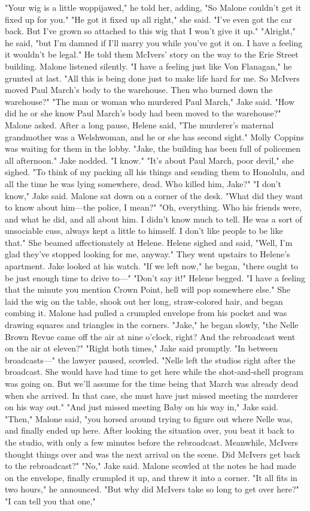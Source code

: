 \documentclass{novel}
\begin{document}
"Your wig is a little woppijawed," he told her, adding, "So Malone couldn't get it fixed up for you." "He got it fixed up all right," she said. "I've even got the car back. But I've grown so attached to this wig that I won't give it up." "Alright," he said, "but I'm damned if I'll marry you while you've got it on. I have a feeling it wouldn't be legal." He told them McIvers' story on the way to the Erie Street building. Malone listened silently. "I have a feeling just like Von Flanagan," he grunted at last. "All this is being done just to make life hard for me. So McIvers moved Paul March's body to the warehouse. Then who burned down the warehouse?" "The man or woman who murdered Paul March," Jake said. "How did he or she know Paul March's body had been moved to the warehouse?" Malone asked. After a long pause, Helene said, "The murderer's maternal grandmother was a Welshwoman, and he or she has second sight." Molly Coppins was waiting for them in the lobby. "Jake, the building has been full of policemen all afternoon." Jake nodded. "I know." "It's about Paul March, poor devil," she sighed. "To think of my packing all his things and sending them to Honolulu, and all the time he was lying somewhere, dead. Who killed him, Jake?" "I don't know," Jake said. Malone sat down on a corner of the desk. "What did they want to know about him—the police, I mean?" "Oh, everything. Who his friends were, and what he did, and all about him. I didn't know much to tell. He was a sort of unsociable cuss, always kept a little to himself. I don't like people to be like that." She beamed affectionately at Helene. Helene sighed and said, "Well, I'm glad they've stopped looking for me, anyway." They went upstairs to Helene's apartment. Jake looked at his watch. "If we left now," he began, "there ought to be just enough time to drive to—" "Don't say it!" Helene begged. "I have a feeling that the minute you mention Crown Point, hell will pop somewhere else." She laid the wig on the table, shook out her long, straw-colored hair, and began combing it. Malone had pulled a crumpled envelope from his pocket and was drawing squares and triangles in the corners. "Jake," he began slowly, "the Nelle Brown Revue came off the air at nine o'clock, right? And the rebroadcast went on the air at eleven?" "Right both times," Jake said promptly. "In between broadcasts—" the lawyer paused, scowled. "Nelle left the studios right after the broadcast. She would have had time to get here while the shot-and-shell program was going on. But we'll assume for the time being that March was already dead when she arrived. In that case, she must have just missed meeting the murderer on his way out." "And just missed meeting Baby on his way in," Jake said. "Then," Malone said, "you horsed around trying to figure out where Nelle was, and finally ended up here. After looking the situation over, you beat it back to the studio, with only a few minutes before the rebroadcast. Meanwhile, McIvers thought things over and was the next arrival on the scene. Did McIvers get back to the rebroadcast?" "No," Jake said. Malone scowled at the notes he had made on the envelope, finally crumpled it up, and threw it into a corner. "It all fits in two hours," he announced. "But why did McIvers take so long to get over here?" "I can tell you that one," 
\end{document}

